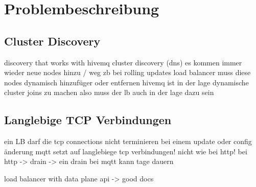 \section{Problembeschreibung}

\subsection{Cluster Discovery}
discovery that works with hivemq cluster discovery (dns)
es kommen immer wieder neue nodes hinzu / weg zb bei rolling updates
load balancer muss diese nodes dynamisch hinzufüger oder entfernen
hivemq ist in der lage dynamische cluster joins zu machen also muss der lb auch in der lage dazu sein

\subsection{Langlebige TCP Verbindungen}
ein LB darf die tcp connections nicht terminieren bei einem update oder config änderung
mqtt setzt auf langlebiege tcp verbindungen! nicht wie bei http! bei http -> drain
-> ein drain bei mqtt kann tage dauern

load balancer with data plane api -> good docs

